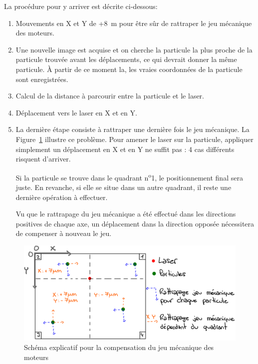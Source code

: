 La procédure pour y arriver est décrite ci-dessous:
\begin{enumerate}
    \item Mouvements en X et Y de +8~\textmu m pour être sûr de rattraper le jeu mécanique des moteurs.
    \item Une nouvelle image est acquise et on cherche la particule la plus proche de la particule trouvée avant les déplacements, ce qui devrait donner la même particule. À partir de ce moment la, les vraies coordonnées de la particule sont enregistrées.
    \item Calcul de la distance à parcourir entre la particule et le laser.
    \item Déplacement vers le laser en X et en Y.
    \item
          La dernière étape consiste à rattraper une dernière fois le jeu mécanique. La Figure~\ref{schema_explicatif_jeu} illustre ce problème. Pour amener le laser sur la particule, appliquer simplement un déplacement en X et en Y ne suffit pas :  4 cas différents risquent d'arriver.

          Si la particule se trouve dans le quadrant n\textsuperscript{o}1, le positionnement final sera juste. En revanche, si elle se situe dans un autre quadrant, il reste une dernière opération à effectuer.

          Vu que le rattrapage du jeu mécanique a été effectué dans les directions positives de chaque axe, un déplacement dans la direction opposée nécessitera de compenser à nouveau le jeu.

\end{enumerate}
\begin{figure}[H]
    \centering
    \includegraphics[width=\textwidth]{assets/figures/Application_ServoVision/Schema_explicatif_jeu_mecanique.jpeg}
    \caption{Schéma explicatif pour la compensation du jeu mécanique des moteurs}
    \label{schema_explicatif_jeu}
\end{figure}
